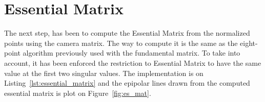 \documentclass{ethz_report}
\begin{document}
\section*{Essential Matrix}

The next step, has been to compute the Essential Matrix from the normalized points using the camera
matrix. The way to compute it is the same as the eight-point algorithm previously used with the
fundamental matrix. To take into account, it has been enforced the restriction to Essential Matrix
to have the same value at the first two singular values. The implementation is on
Listing~\ref{lst:essential_matrix} and the epipolar lines drawn from the computed essential matrix
is plot on Figure~\ref{fig:es_mat}.


\end{document}
